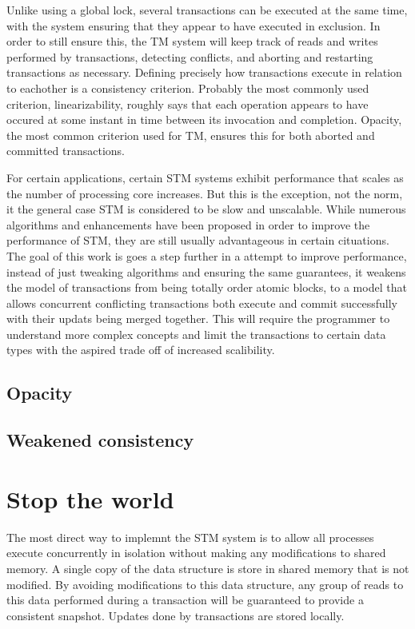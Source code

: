 \documentclass[11pt,letterpaper]{article}
\begin{document}
Unlike using a global lock, several transactions can be executed at the same time,
with the system ensuring that they appear to have executed in exclusion.
In order to still ensure this, the TM system will keep track of reads and writes
performed by transactions, detecting conflicts, and aborting and restarting transactions
as necessary.
Defining precisely how transactions execute in relation to eachother is a consistency criterion.
Probably the most commonly used criterion, linearizability, roughly says that each
operation appears to have occured at some instant in time between its invocation and completion.
Opacity, the most common criterion used for TM, ensures this for both aborted and committed transactions.

For certain applications, certain STM systems exhibit performance that scales as the number
of processing core increases.
But this is the exception, not the norm, it the general case STM is considered to be slow
and unscalable.
While numerous algorithms and enhancements have been proposed in order to improve the performance
of STM, they are still usually advantageous in certain cituations.
The goal of this work is goes a step further in a attempt to improve performance, instead of 
just tweaking algorithms and ensuring the same guarantees, it weakens the model of transactions
from being totally order atomic blocks, to a model that allows concurrent conflicting transactions
both execute and commit successfully with their updats being merged together.
This will require the programmer to understand more complex concepts and limit the transactions
to certain data types with the aspired trade off of increased scalibility.

\subsection{Opacity}

\subsection{Weakened consistency}

\section{Stop the world}

The most direct way to implemnt the STM system is to allow all processes
execute concurrently in isolation without making any modifications to shared memory.
A single copy of the data structure is store in shared memory that is not modified.
By avoiding modifications to this data structure, any group of reads to this data
performed during a transaction will be guaranteed to provide a consistent snapshot.
Updates done by transactions are stored locally.
\end{document}
